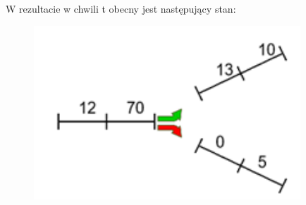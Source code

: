 \documentclass[12pt]{book}
\theoremstyle{plain}
\begin{document}
W rezultacie w chwili t obecny jest następujący stan:
\begin{figure}[H]
	\centering
	\includegraphics[width=10cm]{images/env_11_case_0_po_przeplyw_ie}
	\label{fig:env_11_case_0_po_przeplywie}
\end{figure}\noindent
\end{document}
